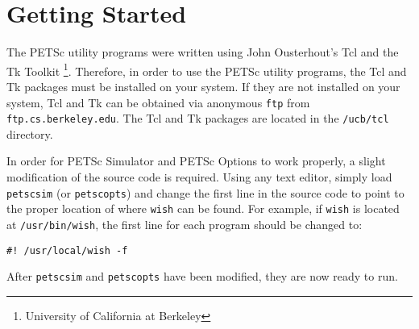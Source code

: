 
\def\note{\medskip \noindent Note:\begin{em}}
\def\endnote{\end{em} \medskip}







\tableofcontents
\listoffigures
\listoftables


\newpage
\section{Getting Started}

The PETSc utility programs were written using John Ousterhout's Tcl and the Tk Toolkit \footnote{University of California at Berkeley}.  Therefore, in order to use the PETSc utility programs, the Tcl and Tk packages must be installed on your system.  If they are not installed on your system, Tcl and Tk can be obtained via anonymous {\tt ftp} from {\tt ftp.cs.berkeley.edu}.  The Tcl and Tk packages are located in the {\tt /ucb/tcl} directory.   

In order for PETSc Simulator and PETSc Options to work properly, a slight modification of the source code is required.  Using any text editor, simply load {\tt petscsim} (or {\tt petscopts}) and change the first line in the source code to point to the proper location of where {\tt wish} can be found.  For example, if {\tt wish} is located at {\tt /usr/bin/wish}, the first line for each program should be changed to:
\begin{verbatim}
#! /usr/local/wish -f
\end{verbatim}
After {\tt petscsim} and {\tt petscopts} have been modified, they are now ready to run.

\newpage


\newpage


%









